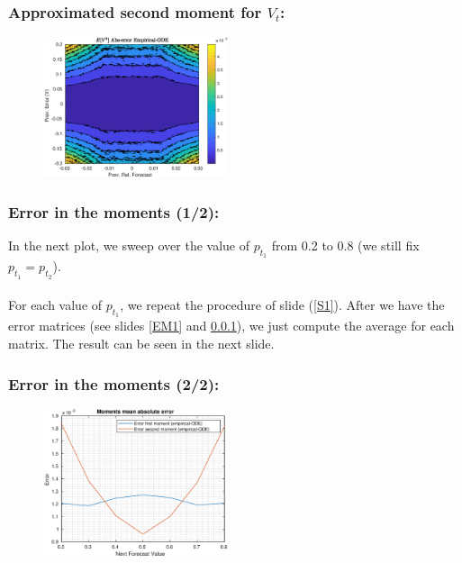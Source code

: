 \documentclass[aspectratio=169]{beamer}\usepackage[utf8]{inputenc}
\begin{document}
\begin{frame}\frametitle{Approximated second moment for $V_t$:} \label{EM2}

\begin{figure}[ht!]
\centering
\includegraphics[width=0.48\textwidth]{../../MATLAB_Files/Results/moments/classic/6.eps}
\end{figure}

\end{frame}


\begin{frame}\frametitle{Error in the moments (1/2):}

In the next plot, we sweep over the value of $p_{t_1}$ from 0.2 to 0.8 (we still fix $p_{t_1}=p_{t_2}$).\\
\quad\\
For each value of $p_{t_1}$, we repeat the procedure of slide (\ref{S1}). After we have the error matrices (see slides \ref{EM1} and \ref{EM2}), we just compute the average for each matrix. The result can be seen in the next slide.

\end{frame}


\begin{frame}\frametitle{Error in the moments (2/2):}

\begin{figure}[ht!]
\centering
\includegraphics[width=0.48\textwidth]{../../MATLAB_Files/Results/moments/classic/7.eps}
\end{figure}

\end{frame}
\end{document}
